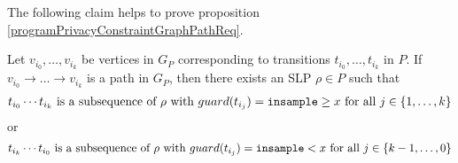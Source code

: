 The following claim helps to prove proposition \ref{programPrivacyConstraintGraphPathReq}.

\begin{prop}
    \label{prop:paths_in_privacy_graph}
    Let $v_{i_0}, \dots, v_{i_k}$ be vertices in $G_P$ corresponding to transitions $t_{i_0}, \dots, t_{i_k}$ in $P$. If $v_{i_0} \to \dots \to v_{i_k}$ is a path in $G_P$, then there exists an SLP $\rho \in P$ such that 
    \begin{align*}
        t_{i_0} \cdots t_{i_k} \text{ is a subsequence of } \rho \text{ with } guard(t_{i_j}) = \texttt{insample}\geq x \text { for all } j \in \{1, \dots, k\}
    \end{align*}
    or
    \begin{align*}
        t_{i_k} \cdots t_{i_0} \text{ is a subsequence of } \rho \text{ with } guard(t_{i_j}) = \texttt{insample} < x \text { for all } j \in \{k - 1, \dots, 0\}
    \end{align*}
\end{prop}



